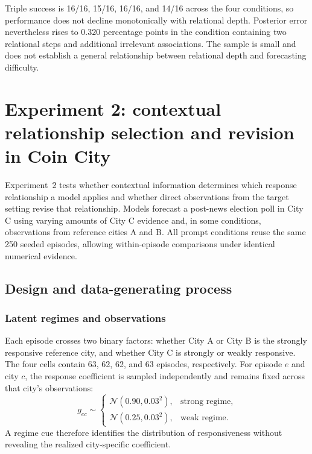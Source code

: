 Triple success is 16/16, 15/16, 16/16, and 14/16 across the four conditions, so performance does not decline monotonically with relational depth.
Posterior error nevertheless rises to $0.320$ percentage points in the condition containing two relational steps and additional irrelevant associations.
The sample is small and does not establish a general relationship between relational depth and forecasting difficulty.

\section{Experiment 2: contextual relationship selection and revision in Coin City}
\label{app:coin-city}

Experiment~2 tests whether contextual information determines which response relationship a model applies and whether direct observations from the target setting revise that relationship.
Models forecast a post-news election poll in City C using varying amounts of City C evidence and, in some conditions, observations from reference cities A and B.
All prompt conditions reuse the same 250 seeded episodes, allowing within-episode comparisons under identical numerical evidence.

\subsection{Design and data-generating process}
\label{app:coin-city-design}

\subsubsection{Latent regimes and observations}

Each episode crosses two binary factors: whether City A or City B is the strongly responsive reference city, and whether City C is strongly or weakly responsive.
The four cells contain 63, 62, 62, and 63 episodes, respectively.
For episode $e$ and city $c$, the response coefficient is sampled independently and remains fixed across that city's observations:
\[
g_{ec}\sim
\begin{cases}
\mathcal N(0.90,0.03^2), & \text{strong regime},\\
\mathcal N(0.25,0.03^2), & \text{weak regime}.
\end{cases}
\]
A regime cue therefore identifies the distribution of responsiveness without revealing the realized city-specific coefficient.


